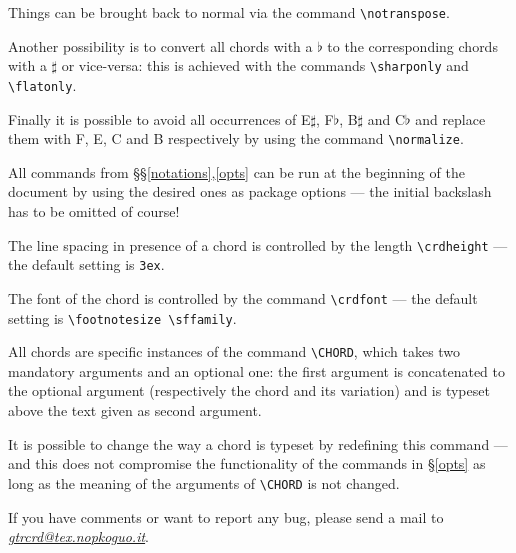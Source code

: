 \documentclass[green,a4paper,oneside,openany,noparindent,noparskip,article,nomatter]{bookest}
\begin{document}
Things can be brought back to normal via the command \texttt{\textbackslash notranspose}.

\ppar
Another possibility is to convert all chords with a $\flat$ to the corresponding chords with a $\sharp$ or vice-versa: this is achieved with the commands \texttt{\textbackslash sharponly} and \texttt{\textbackslash flatonly}.

\ppar
Finally it is possible to avoid all occurrences of E$\sharp$, F$\flat$, B$\sharp$ and C$\flat$ and replace them with F, E, C and B respectively by using the command \texttt{\textbackslash normalize}.

All commands from \S\S\ref{notations},\ref{opts} can be run at the beginning of the document by using the desired ones as package options --- the initial backslash has to be omitted of course!

The line spacing in presence of a chord is controlled by the length \texttt{\textbackslash crdheight} --- the default setting is \texttt{3ex}.

\ppar
The font of the chord is controlled by the command \texttt{\textbackslash crdfont} --- the default setting is \texttt{\textbackslash footnotesize \textbackslash sffamily}.

\ppar
All chords are specific instances of the command \texttt{\textbackslash CHORD}, which takes two mandatory arguments and an optional one: the first argument is concatenated to the optional argument (respectively the chord and its variation) and is typeset above the text given as second argument.

It is possible to change the way a chord is typeset by redefining this command --- and this does not compromise the functionality of the commands in \S\ref{opts} as long as the meaning of the arguments of \texttt{\textbackslash CHORD} is not changed.

If you have comments or want to report any bug, please send a mail to \textsl{\href{mailto:gtrcrd@tex.nopkoguo.net}{gtrcrd@tex.nopkoguo.it}}.
\end{document}
